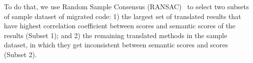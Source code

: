 To do that, we use Random Sample Consensus
(RANSAC)~\cite{Fischler:1981:RSC:358669.358692} to select two subsets
of sample dataset of migrated code: 1) the largest set of translated
results that have highest correlation coefficient between {\model}
scores and semantic scores of the results (Subset 1); and 2) the
remaining translated methods in the sample dataset, in which they get inconsistent
between semantic scores and {\model} scores (Subset 2).
%
%
%
